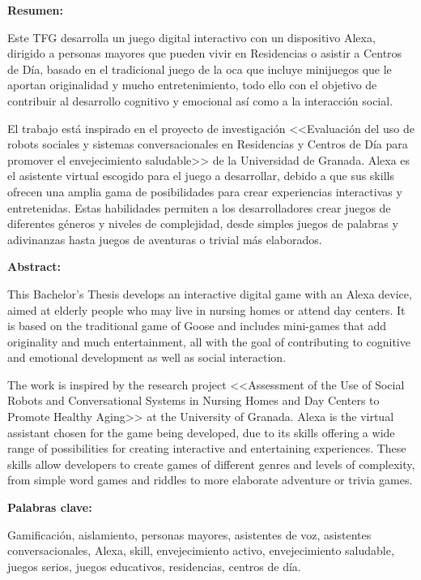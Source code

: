 \documentclass[12pt]{article}
\begin{document}
\newpage
\justifying

\textbf{Resumen:}

Este TFG desarrolla un juego digital interactivo con un dispositivo Alexa, dirigido a personas mayores que pueden vivir en Residencias o asistir a Centros de Día, basado en el tradicional juego de la oca que incluye minijuegos que le aportan originalidad y mucho entretenimiento, todo ello con el objetivo de contribuir al desarrollo cognitivo y emocional así como a la interacción social. 

El trabajo está inspirado en el proyecto de investigación <<Evaluación del uso de robots sociales y sistemas conversacionales en Residencias y Centros de Día para promover el envejecimiento saludable>> de la Universidad de Granada. Alexa es el asistente virtual escogido para el juego a desarrollar, debido a que sus skills ofrecen una amplia gama de posibilidades para crear experiencias interactivas y entretenidas. Estas habilidades permiten a los desarrolladores crear juegos de diferentes géneros y niveles de complejidad, desde simples juegos de palabras y adivinanzas hasta juegos de aventuras o trivial más elaborados.

\vline

\textbf{Abstract:}

This Bachelor's Thesis develops an interactive digital game with an Alexa device, aimed at elderly people who may live in nursing homes or attend day centers. It is based on the traditional game of Goose and includes mini-games that add originality and much entertainment, all with the goal of contributing to cognitive and emotional development as well as social interaction.

The work is inspired by the research project <<Assessment of the Use of Social Robots and Conversational Systems in Nursing Homes and Day Centers to Promote Healthy Aging>> at the University of Granada. Alexa is the virtual assistant chosen for the game being developed, due to its skills offering a wide range of possibilities for creating interactive and entertaining experiences. These skills allow developers to create games of different genres and levels of complexity, from simple word games and riddles to more elaborate adventure or trivia games.

\vline

\textbf{Palabras clave:}

Gamificación, aislamiento, personas mayores, asistentes de voz, asistentes conversacionales, Alexa, skill, envejecimiento activo, envejecimiento saludable, juegos serios, juegos educativos, residencias, centros de día.
\end{document}
